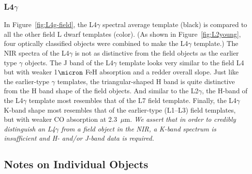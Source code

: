 \documentclass[12pt,preprint]{aastex}
\begin{document}
\subsubsection{L4$\gamma$}
In Figure~\ref{fig:L4g-field}, the L4$\gamma$ spectral average template (black) is compared to all the other field L dwarf templates (color). (As shown in Figure~\ref{fig:L2young}, four optically classified objects were combined to make the L4$\gamma$ template.) 
The NIR spectra of the L4$\gamma$ is not as distinctive from the field objects as the earlier type $\gamma$ objects. 
The J band of the L4$\gamma$ template looks very similar to the field L4 but with weaker 1$\micron$ FeH absorption and a redder overall slope. 
Just like the earlier-type $\gamma$ templates, the triangular-shaped H band is quite distinctive from the H band shape of the field objects. And similar to the L2$\gamma$, the H-band of the L4$\gamma$ template most resembles that of the L7 field template.
Finally, the L4$\gamma$ K-band shape most resembles that of the earlier-type (L1--L3) field templates, but with weaker CO absorption at 2.3~$\mu$m.
\emph{We assert that in order to credibly distinguish an L4$\gamma$ from a field object in the NIR, a K-band spectrum is insufficient and H- and/or J-band data is required.}

\subsection{Notes on Individual Objects}
% 
\end{document}
